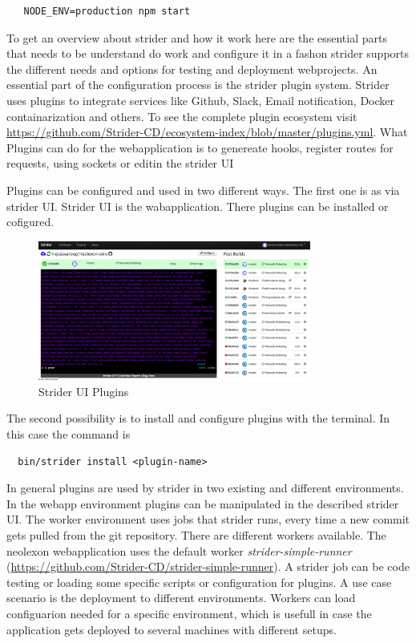 \begin{lstlisting}
   NODE_ENV=production npm start
\end{lstlisting}

To get an overview about strider and how it work here are the essential parts that needs to be understand do work and configure
it in a fashon strider supports the different needs and options for testing and deployment webprojects. An essential part of
the configuration process is the strider plugin system. Strider uses plugins to integrate services like Github, Slack, Email
notification, Docker containarization and others. To see the complete plugin ecosystem visit \url{https://github.com/Strider-CD/ecosystem-index/blob/master/plugins.yml}.
What Plugins can do for the webapplication is to genereate hooks, register routes for requests, using sockets or editin the strider
UI

Plugins can be configured and used in two different ways. The first one is as via strider UI. Strider UI is the wabapplication.
There plugins can be installed or cofigured.

\begin{figure}[h!]
  \centering
      \includegraphics[width=0.8\textwidth]{images/striderUI.png}
  \caption{Strider UI Plugins}
\end{figure}

The second possibility is to install and configure plugins with the terminal. In this case the command is
\begin{lstlisting}
  bin/strider install <plugin-name>
\end{lstlisting}

In general plugins are used by strider in two existing and different environments. In the webapp environment plugins can be manipulated
in the described strider UI. The worker environment uses jobs that strider runs, every time a new commit gets pulled from the git
repository. There are different workers available. The neolexon webapplication uses the default worker \textit{strider-simple-runner}
(\url{https://github.com/Strider-CD/strider-simple-runner}). A strider job can be code testing or loading some specific scripts or
configuration for plugins. A use case scenario is the deployment to different environments. Workers can load configuarion needed for
a specific environment, which is usefull in case the application gets deployed to several machines with different setups.

